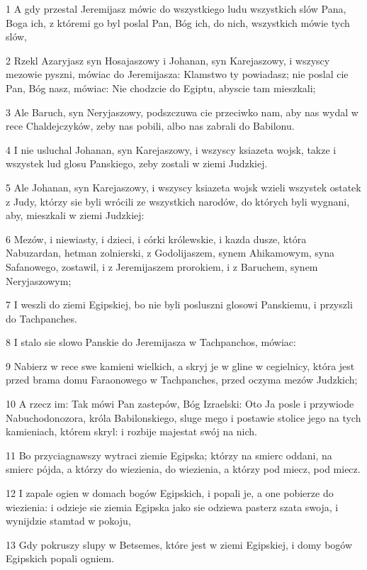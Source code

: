 \par 1 A gdy przestal Jeremijasz mówic do wszystkiego ludu wszystkich slów Pana, Boga ich, z któremi go byl poslal Pan, Bóg ich, do nich, wszystkich mówie tych slów,
\par 2 Rzekl Azaryjasz syn Hosajaszowy i Johanan, syn Karejaszowy, i wszyscy mezowie pyszni, mówiac do Jeremijasza: Klamstwo ty powiadasz; nie poslal cie Pan, Bóg nasz, mówiac: Nie chodzcie do Egiptu, abyscie tam mieszkali;
\par 3 Ale Baruch, syn Neryjaszowy, podszczuwa cie przeciwko nam, aby nas wydal w rece Chaldejczyków, zeby nas pobili, albo nas zabrali do Babilonu.
\par 4 I nie usluchal Johanan, syn Karejaszowy, i wszyscy ksiazeta wojsk, takze i wszystek lud glosu Panskiego, zeby zostali w ziemi Judzkiej.
\par 5 Ale Johanan, syn Karejaszowy, i wszyscy ksiazeta wojsk wzieli wszystek ostatek z Judy, którzy sie byli wrócili ze wszystkich narodów, do których byli wygnani, aby, mieszkali w ziemi Judzkiej:
\par 6 Mezów, i niewiasty, i dzieci, i córki królewskie, i kazda dusze, która Nabuzardan, hetman zolnierski, z Godolijaszem, synem Ahikamowym, syna Safanowego, zostawil, i z Jeremijaszem prorokiem, i z Baruchem, synem Neryjaszowym;
\par 7 I weszli do ziemi Egipskiej, bo nie byli posluszni glosowi Panskiemu, i przyszli do Tachpanches.
\par 8 I stalo sie slowo Panskie do Jeremijasza w Tachpanchos, mówiac:
\par 9 Nabierz w rece swe kamieni wielkich, a skryj je w gline w cegielnicy, która jest przed brama domu Faraonowego w Tachpanches, przed oczyma mezów Judzkich;
\par 10 A rzecz im: Tak mówi Pan zastepów, Bóg Izraelski: Oto Ja posle i przywiode Nabuchodonozora, króla Babilonskiego, sluge mego i postawie stolice jego na tych kamieniach, którem skryl: i rozbije majestat swój na nich.
\par 11 Bo przyciagnawszy wytraci ziemie Egipska; którzy na smierc oddani, na smierc pójda, a którzy do wiezienia, do wiezienia, a którzy pod miecz, pod miecz.
\par 12 I zapale ogien w domach bogów Egipskich, i popali je, a one pobierze do wiezienia: i odzieje sie ziemia Egipska jako sie odziewa pasterz szata swoja, i wynijdzie stamtad w pokoju,
\par 13 Gdy pokruszy slupy w Betsemes, które jest w ziemi Egipskiej, i domy bogów Egipskich popali ogniem.

